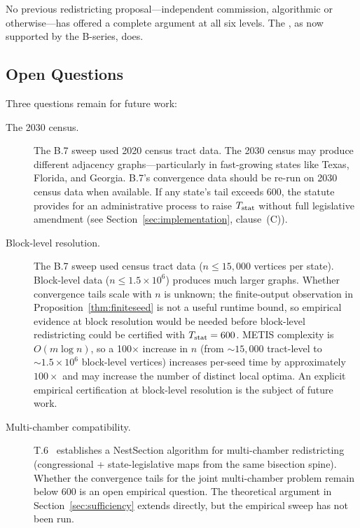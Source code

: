 No previous redistricting proposal---independent commission, algorithmic
or otherwise---has offered a complete argument at all six levels.
The \dia{}, as now supported by the B-series, does.

\subsection{Open Questions}

Three questions remain for future work:

\begin{description}
\item[The 2030 census.]
The B.7 sweep used 2020 census tract data.
The 2030 census may produce different adjacency graphs---particularly in
fast-growing states like Texas, Florida, and Georgia.
B.7's convergence data should be re-run on 2030 census data when available.
If any state's tail exceeds 600, the statute provides for an administrative
process to raise $T_{\mathrm{stat}}$ without full legislative amendment (see
Section~\ref{sec:implementation}, clause~(C)).

\item[Block-level resolution.]
The B.7 sweep used census tract data ($n \le 15{,}000$ vertices per state).
Block-level data ($n \le 1.5 \times 10^6$) produces much larger graphs.
Whether \cs{} convergence tails scale with $n$ is unknown; the finite-output
observation in Proposition~\ref{thm:finiteseed} is not a useful runtime bound,
so empirical evidence at block resolution would be needed before block-level
redistricting could be certified with $T_{\mathrm{stat}} = 600$.
METIS complexity is $O(m \log n)$, so a 100$\times$ increase in $n$ (from
${\sim}15{,}000$ tract-level to ${\sim}1.5 \times 10^6$ block-level vertices)
increases per-seed time by approximately $100\times$ and may increase the number
of distinct local optima.
An explicit empirical certification at block-level resolution is the subject
of future work.

\item[Multi-chamber compatibility.]
T.6~\citep{b13paper} establishes a NestSection algorithm for multi-chamber
redistricting (congressional + state-legislative maps from the same bisection
spine).
Whether the \cs{} convergence tails for the joint multi-chamber problem
remain below 600 is an open empirical question.
The theoretical argument in Section~\ref{sec:sufficiency} extends directly,
but the empirical sweep has not been run.
\end{description}

